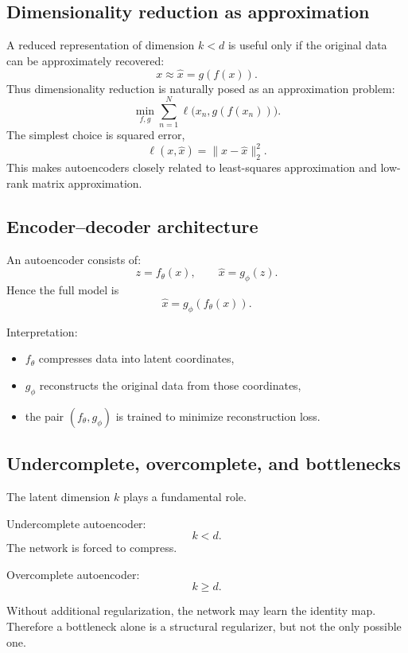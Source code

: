 \documentclass[%
oneside,                 %
final,                   %
10pt]{article}
\begin{document}
\subsection{Dimensionality reduction as approximation}

A reduced representation of dimension \(k<d\) is useful only if the original data can be approximately recovered:
\[
x \approx \hat x = g(f(x)).
\]
Thus dimensionality reduction is naturally posed as an approximation problem:
\[
\min_{f,g} \sum_{n=1}^N \ell\bigl(x_n,g(f(x_n))\bigr).
\]
The simplest choice is squared error,
\[
\ell(x,\hat x)=\|x-\hat x\|_2^2.
\]
This makes autoencoders closely related to least-squares approximation and low-rank matrix approximation.

\subsection{Encoder--decoder architecture}

An autoencoder consists of:
\[
z = f_\theta(x), \qquad \hat x = g_\phi(z).
\]
Hence the full model is
\[
\hat x = g_\phi(f_\theta(x)).
\]
\begin{block}{Interpretation: }
\begin{itemize}
\item \(f_\theta\) compresses data into latent coordinates,

\item \(g_\phi\) reconstructs the original data from those coordinates,

\item the pair \((f_\theta,g_\phi)\) is trained to minimize reconstruction loss.
\end{itemize}

\noindent
\end{block}

\subsection{Undercomplete, overcomplete, and bottlenecks}

The latent dimension \(k\) plays a fundamental role.

\begin{block}{Undercomplete autoencoder: }
\[
k<d.
\]
The network is forced to compress.
\end{block}
\begin{block}{Overcomplete autoencoder: }
\[
k\ge d.
\]
\end{block}
Without additional regularization, the network may learn the identity map.
Therefore a bottleneck alone is a structural regularizer, but not the only possible one.
\end{document}
